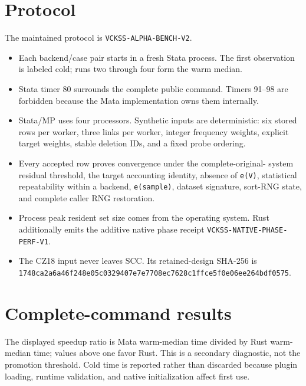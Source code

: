 \documentclass[11pt]{article}
\begin{document}
\section{Protocol}

The maintained protocol is \texttt{VCKSS-ALPHA-BENCH-V2}.

\begin{itemize}
  \item Each backend/case pair starts in a fresh Stata process.  The first
  observation is labeled cold; runs two through four form the warm median.
  \item Stata timer 80 surrounds the complete public command.  Timers 91--98
  are forbidden because the Mata implementation owns them internally.
  \item Stata/MP uses four processors.  Synthetic inputs are deterministic:
  six stored rows per worker, three links per worker, integer frequency
  weights, explicit target weights, stable deletion IDs, and a fixed probe
  ordering.
  \item Every accepted row proves convergence under the complete-original-
  system residual threshold, the target accounting identity, absence of
  \texttt{e(V)}, statistical repeatability within a backend, \texttt{e(sample)},
  dataset signature, sort-RNG state, and complete caller RNG restoration.
  \item Process peak resident set size comes from the operating system.  Rust
  additionally emits the additive native phase receipt
  \texttt{VCKSS-NATIVE-PHASE-PERF-V1}.
  \item The CZ18 input never leaves SCC.  Its retained-design SHA-256 is
  \texttt{1748ca2a6a46f248e05c0329407e7e7708ec7628c1ffce5f0e06ee264bdf0575}.
\end{itemize}

\section{Complete-command results}

\begin{center}
\small

\end{center}

\begin{center}

\end{center}

The displayed speedup ratio is Mata warm-median time divided by Rust warm-
median time; values above one favor Rust.  This is a secondary diagnostic, not
the promotion threshold.  Cold time is reported rather than discarded because
plugin loading, runtime validation, and native initialization affect first use.
\end{document}
